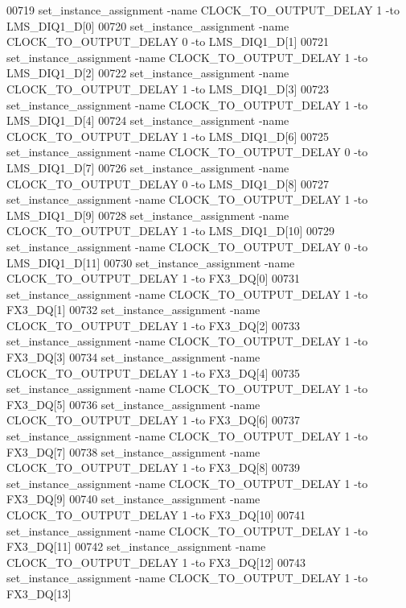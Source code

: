 \begin{DoxyCode}
00719 set\_instance\_assignment -name CLOCK\_TO\_OUTPUT\_DELAY \textcolor{vhdllogic}{1} -to LMS\_DIQ1\_D[0]
00720 set\_instance\_assignment -name CLOCK\_TO\_OUTPUT\_DELAY \textcolor{vhdllogic}{0} -to LMS\_DIQ1\_D[1]
00721 set\_instance\_assignment -name CLOCK\_TO\_OUTPUT\_DELAY \textcolor{vhdllogic}{1} -to LMS\_DIQ1\_D[2]
00722 set\_instance\_assignment -name CLOCK\_TO\_OUTPUT\_DELAY \textcolor{vhdllogic}{1} -to LMS\_DIQ1\_D[3]
00723 set\_instance\_assignment -name CLOCK\_TO\_OUTPUT\_DELAY \textcolor{vhdllogic}{1} -to LMS\_DIQ1\_D[4]
00724 set\_instance\_assignment -name CLOCK\_TO\_OUTPUT\_DELAY \textcolor{vhdllogic}{1} -to LMS\_DIQ1\_D[6]
00725 set\_instance\_assignment -name CLOCK\_TO\_OUTPUT\_DELAY \textcolor{vhdllogic}{0} -to LMS\_DIQ1\_D[7]
00726 set\_instance\_assignment -name CLOCK\_TO\_OUTPUT\_DELAY \textcolor{vhdllogic}{0} -to LMS\_DIQ1\_D[8]
00727 set\_instance\_assignment -name CLOCK\_TO\_OUTPUT\_DELAY \textcolor{vhdllogic}{1} -to LMS\_DIQ1\_D[9]
00728 set\_instance\_assignment -name CLOCK\_TO\_OUTPUT\_DELAY \textcolor{vhdllogic}{1} -to LMS\_DIQ1\_D[10]
00729 set\_instance\_assignment -name CLOCK\_TO\_OUTPUT\_DELAY \textcolor{vhdllogic}{0} -to LMS\_DIQ1\_D[11]
00730 set\_instance\_assignment -name CLOCK\_TO\_OUTPUT\_DELAY \textcolor{vhdllogic}{1} -to FX3\_DQ[0]
00731 set\_instance\_assignment -name CLOCK\_TO\_OUTPUT\_DELAY \textcolor{vhdllogic}{1} -to FX3\_DQ[1]
00732 set\_instance\_assignment -name CLOCK\_TO\_OUTPUT\_DELAY \textcolor{vhdllogic}{1} -to FX3\_DQ[2]
00733 set\_instance\_assignment -name CLOCK\_TO\_OUTPUT\_DELAY \textcolor{vhdllogic}{1} -to FX3\_DQ[3]
00734 set\_instance\_assignment -name CLOCK\_TO\_OUTPUT\_DELAY \textcolor{vhdllogic}{1} -to FX3\_DQ[4]
00735 set\_instance\_assignment -name CLOCK\_TO\_OUTPUT\_DELAY \textcolor{vhdllogic}{1} -to FX3\_DQ[5]
00736 set\_instance\_assignment -name CLOCK\_TO\_OUTPUT\_DELAY \textcolor{vhdllogic}{1} -to FX3\_DQ[6]
00737 set\_instance\_assignment -name CLOCK\_TO\_OUTPUT\_DELAY \textcolor{vhdllogic}{1} -to FX3\_DQ[7]
00738 set\_instance\_assignment -name CLOCK\_TO\_OUTPUT\_DELAY \textcolor{vhdllogic}{1} -to FX3\_DQ[8]
00739 set\_instance\_assignment -name CLOCK\_TO\_OUTPUT\_DELAY \textcolor{vhdllogic}{1} -to FX3\_DQ[9]
00740 set\_instance\_assignment -name CLOCK\_TO\_OUTPUT\_DELAY \textcolor{vhdllogic}{1} -to FX3\_DQ[10]
00741 set\_instance\_assignment -name CLOCK\_TO\_OUTPUT\_DELAY \textcolor{vhdllogic}{1} -to FX3\_DQ[11]
00742 set\_instance\_assignment -name CLOCK\_TO\_OUTPUT\_DELAY \textcolor{vhdllogic}{1} -to FX3\_DQ[12]
00743 set\_instance\_assignment -name CLOCK\_TO\_OUTPUT\_DELAY \textcolor{vhdllogic}{1} -to FX3\_DQ[13]

\end{DoxyCode}
